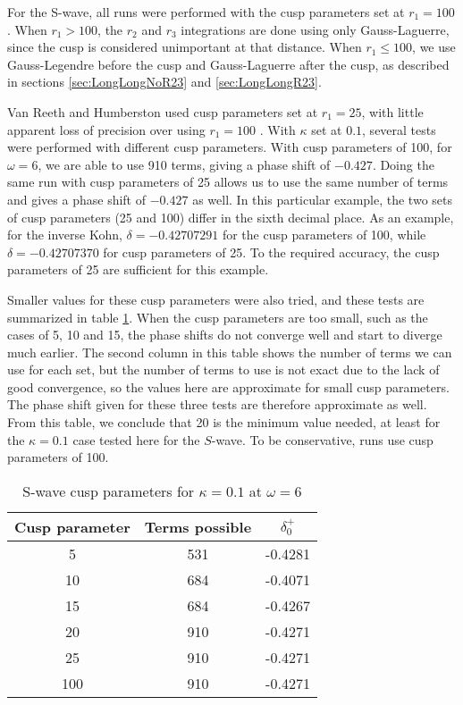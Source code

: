 \documentclass[Dissertation.tex]{subfiles}
\begin{document}
For the S-wave, all runs were performed with the cusp parameters set at $r_1 = 100$. When $r_1 > 100$, the $r_2$ and $r_3$ integrations are done using only Gauss-Laguerre, since the cusp is considered unimportant at that distance. When $r_1 \leq 100$, we use Gauss-Legendre before the cusp and Gauss-Laguerre after the cusp, as described in sections \ref{sec:LongLongNoR23} and \ref{sec:LongLongR23}. 

Van Reeth and Humberston used cusp parameters set at $r_1 = 25$, with little apparent loss of precision over using $r_1 = 100$ \cite{}. With $\kappa$ set at $0.1$, several tests were performed with different cusp parameters. With cusp parameters of 100, for $\omega = 6$, we are able to use 910 terms, giving a phase shift of $-0.427$. Doing the same run with cusp parameters of 25 allows us to use the same number of terms and gives a phase shift of $-0.427$ as well. In this particular example, the two sets of cusp parameters (25 and 100) differ in the sixth decimal place. As an example, for the inverse Kohn, $\delta = -0.42707291$ for the cusp parameters of 100, while $\delta = -0.42707370$ for cusp parameters of 25. To the required accuracy, the cusp parameters of 25 are sufficient for this example.

Smaller values for these cusp parameters were also tried, and these tests are summarized in table \ref{tab:SWaveCuspParameters}. When the cusp parameters are too small, such as the cases of 5, 10 and 15, the phase shifts do not converge well and start to diverge much earlier. The second column in this table shows the number of terms we can use for each set, but the number of terms to use is not exact due to the lack of good convergence, so the values here are approximate for small cusp parameters. The phase shift given for these three tests are therefore approximate as well. From this table, we conclude that 20 is the minimum value needed, at least for the $\kappa = 0.1$ case tested here for the $S$-wave. To be conservative, runs use cusp parameters of 100. 



\begin{table}[H]
\centering
\begin{tabular}{c c c}
\toprule
Cusp parameter & Terms possible & $\delta_0^+$ \\
\midrule
 5 & 531 & -0.4281 \\
10 & 684 & -0.4071 \\
15 & 684 & -0.4267 \\
20 & 910 & -0.4271 \\
25 & 910 & -0.4271 \\
100 & 910 & -0.4271 \\
\bottomrule
\end{tabular}
\caption{S-wave cusp parameters for $\kappa = 0.1$ at $\omega = 6$}
\label{tab:SWaveCuspParameters}
\end{table}
\end{document}
